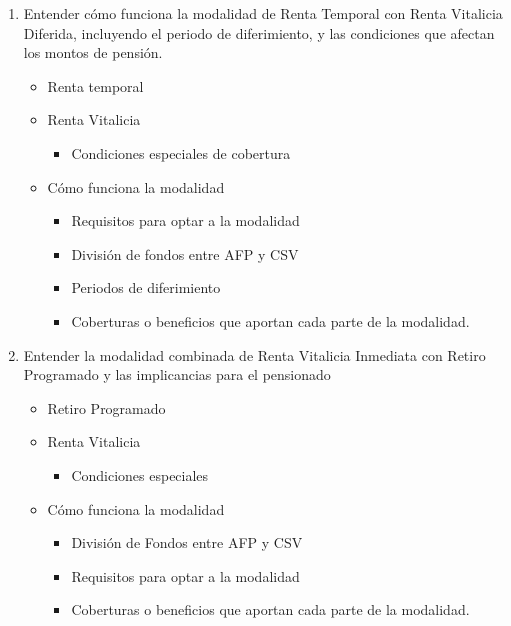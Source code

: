 \begin{enumerate}
\begin{enumerate}
        \item Entender cómo funciona la modalidad de Renta Temporal con Renta Vitalicia Diferida, incluyendo el periodo de diferimiento, y las condiciones que afectan los montos de pensión.  
        \begin{itemize}
            \item Renta temporal 
            \item Renta Vitalicia 
            \begin{itemize}
                \item Condiciones especiales de cobertura 
            \end{itemize}
            \item Cómo funciona la modalidad 
            \begin{itemize}
                \item Requisitos para optar a la modalidad
                \item División de fondos entre AFP y CSV 
                \item Periodos de diferimiento 
                \item Coberturas o beneficios que aportan cada parte de la modalidad.
            \end{itemize}
        \end{itemize}
        \item Entender la modalidad combinada de Renta Vitalicia Inmediata con Retiro Programado y las implicancias para el pensionado
        \begin{itemize}
            \item Retiro Programado
            \item Renta Vitalicia 
            \begin{itemize}
                \item Condiciones especiales 
            \end{itemize}
            \item Cómo funciona la modalidad 
            \begin{itemize}
                \item División de Fondos entre AFP y CSV
                \item Requisitos para optar a la modalidad 
                \item Coberturas o beneficios que aportan cada parte de la modalidad.
            \end{itemize}
        \end{itemize}
        \end{enumerate}
    


\end{enumerate}
